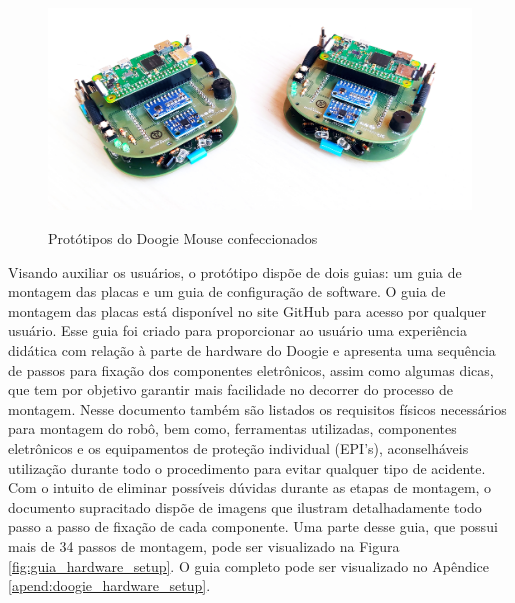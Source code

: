 \begin{figure}[H]
	\centering
	\caption{Protótipos do Doogie Mouse confeccionados}
	\includegraphics[width=1\textwidth]
	{Figures/doogie_mouse_prototipos}
	\label{fig:prototipos}
\end{figure}

Visando auxiliar os usuários, o protótipo dispõe de dois guias: um guia de montagem das placas e um guia de configuração de software. O guia de montagem das placas está disponível no site GitHub para acesso por qualquer usuário. Esse guia foi criado para proporcionar ao usuário uma experiência didática com relação à parte de hardware do Doogie e apresenta uma sequência de passos para fixação dos componentes eletrônicos, assim como algumas dicas, que tem por objetivo garantir mais facilidade no decorrer do processo de montagem. Nesse documento também são listados os requisitos físicos necessários para montagem do robô, bem como, ferramentas utilizadas, componentes eletrônicos e os equipamentos de proteção individual (EPI’s), aconselháveis utilização durante todo o procedimento para evitar qualquer tipo de acidente. Com o intuito de eliminar possíveis dúvidas durante as etapas de montagem, o documento supracitado dispõe de imagens que ilustram detalhadamente todo passo a passo de fixação de cada componente. Uma parte desse guia, que possui mais de 34 passos de montagem,  pode ser visualizado na Figura \ref{fig:guia_hardware_setup}. O guia completo pode ser visualizado no Apêndice \ref{apend:doogie_hardware_setup}.

